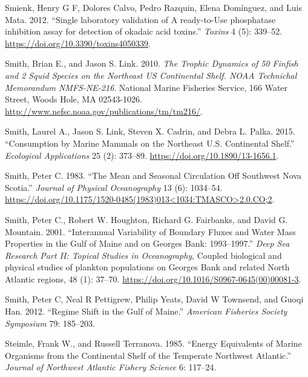 \documentclass[
]{book}
\begin{document}
\leavevmode\hypertarget{ref-Smienk2012}{}%
Smienk, Henry G F, Dolores Calvo, Pedro Razquin, Elena Domínguez, and Luis Mata. 2012. ``Single laboratory validation of A ready-to-Use phosphatase inhibition assay for detection of okadaic acid toxins.'' \emph{Toxins} 4 (5): 339--52. \url{https://doi.org/10.3390/toxins4050339}.

\leavevmode\hypertarget{ref-smith_trophic_2010}{}%
Smith, Brian E., and Jason S. Link. 2010. \emph{The Trophic Dynamics of 50 Finfish and 2 Squid Species on the Northeast US Continental Shelf. NOAA Technichal Memorandum NMFS-NE-216}. National Marine Fisheries Service, 166 Water Street, Woods Hole, MA 02543-1026. \url{http://www.nefsc.noaa.gov/publications/tm/tm216/}.

\leavevmode\hypertarget{ref-smith_consumption_2015}{}%
Smith, Laurel A., Jason S. Link, Steven X. Cadrin, and Debra L. Palka. 2015. ``Consumption by Marine Mammals on the Northeast U.S. Continental Shelf.'' \emph{Ecological Applications} 25 (2): 373--89. \url{https://doi.org/10.1890/13-1656.1}.

\leavevmode\hypertarget{ref-smith_mean_1983}{}%
Smith, Peter C. 1983. ``The Mean and Seasonal Circulation Off Southwest Nova Scotia.'' \emph{Journal of Physical Oceanography} 13 (6): 1034--54. \href{https://doi.org/10.1175/1520-0485(1983)013\%3C1034:TMASCO\%3E2.0.CO;2}{https://doi.org/10.1175/1520-0485(1983)013\textless{}1034:TMASCO\textgreater{}2.0.CO;2}.

\leavevmode\hypertarget{ref-smith_interannual_2001}{}%
Smith, Peter C., Robert W. Houghton, Richard G. Fairbanks, and David G. Mountain. 2001. ``Interannual Variability of Boundary Fluxes and Water Mass Properties in the Gulf of Maine and on Georges Bank: 1993--1997.'' \emph{Deep Sea Research Part II: Topical Studies in Oceanography}, Coupled biological and physical studies of plankton populations on Georges Bank and related North Atlantic regions, 48 (1): 37--70. \url{https://doi.org/10.1016/S0967-0645(00)00081-3}.

\leavevmode\hypertarget{ref-smith_regime_2012}{}%
Smith, Peter C, Neal R Pettigrew, Philip Yeats, David W Townsend, and Guoqi Han. 2012. ``Regime Shift in the Gulf of Maine.'' \emph{American Fisheries Society Symposium} 79: 185--203.

\leavevmode\hypertarget{ref-steimle1985}{}%
Steimle, Frank W., and Russell Terranova. 1985. ``Energy Equivalents of Marine Organisms from the Continental Shelf of the Temperate Northwest Atlantic.'' \emph{Journal of Northwest Atlantic Fishery Science} 6: 117--24.
\end{document}
